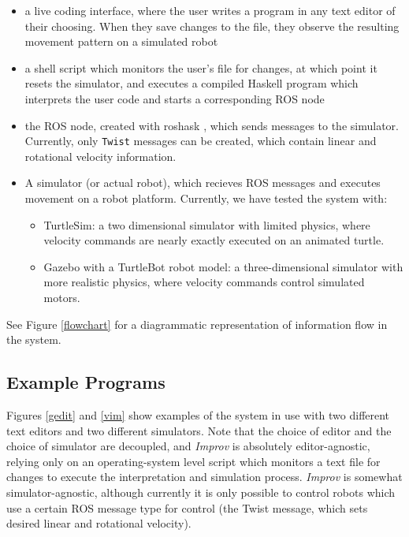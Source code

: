 \documentclass[sigconf]{acmart}
\begin{document}
\begin{itemize}
\item
  a live coding interface, where the user writes a program in any text
  editor of their choosing. When they save changes to the file, they
  observe the resulting movement pattern on a simulated robot
\item
  a shell script which monitors the user's file for changes, at which
  point it resets the simulator, and executes a compiled Haskell program
  which interprets the user code and starts a corresponding ROS node
\item
  the ROS node, created with roshask \cite{cowley2011stream}, which sends messages to
  the simulator. Currently, only \texttt{Twist} messages can be created,
  which contain linear and rotational velocity information.
\item
  A simulator (or actual robot), which recieves ROS messages and
  executes movement on a robot platform. Currently, we have tested the
  system with:
  \begin{itemize}
  \item
    TurtleSim: a two dimensional simulator with limited physics, where
    velocity commands are nearly exactly executed on an animated turtle.
  \item
    Gazebo with a TurtleBot robot model: a three-dimensional simulator
    with more realistic physics, where velocity commands control
    simulated motors.
  \end{itemize}
\end{itemize}

See Figure \ref{flowchart} for a diagrammatic representation of
information flow in the system.


\subsection{Example Programs}\label{example-programs}

Figures \ref{gedit} and \ref{vim} show examples of the system in use with two
different text editors and two different simulators. Note that the choice of
editor and the choice of simulator are decoupled, and \emph{Improv} is
absolutely editor-agnostic, relying only on an operating-system level script
which monitors a text file for changes to execute the interpretation and
simulation process. \emph{Improv} is somewhat simulator-agnostic, although
currently it is only possible to control robots which use a certain ROS message
type for control (the Twist message, which sets desired linear and rotational
velocity).
\end{document}
